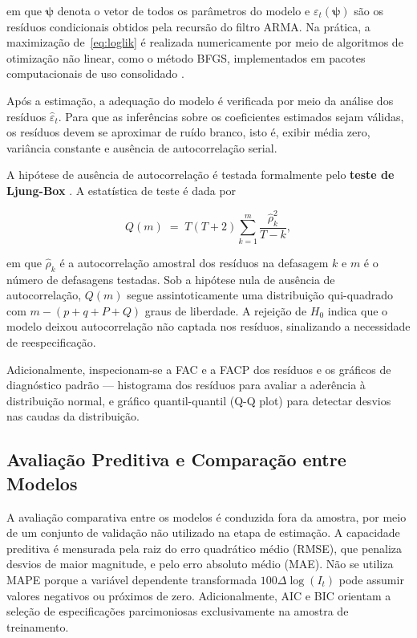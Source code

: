 \noindent
em que \(\boldsymbol{\psi}\) denota o vetor de todos os parâmetros do modelo e
\(\varepsilon_t(\boldsymbol{\psi})\) são os resíduos condicionais obtidos
pela recursão do filtro ARMA. Na prática, a maximização de~\eqref{eq:loglik}
é realizada numericamente por meio de algoritmos de otimização não linear,
como o método BFGS, implementados em pacotes computacionais de uso
consolidado \citep{shumway2017}.
 

Após a estimação, a adequação do modelo é verificada por meio da análise
dos resíduos \(\hat\varepsilon_t\). Para que as inferências sobre os
coeficientes estimados sejam válidas, os resíduos devem se aproximar de
ruído branco, isto é, exibir média zero, variância constante e ausência de
autocorrelação serial.
 
A hipótese de ausência de autocorrelação é testada formalmente pelo
\textbf{teste de Ljung-Box} \citep{ljung1978}. A estatística de teste é
dada por
 
\begin{equation}
  Q(m) \;=\; T(T+2)\sum_{k=1}^{m}\frac{\hat{\rho}_k^2}{T - k},
  \label{eq:ljungbox}
\end{equation}
 
\noindent
em que \(\hat{\rho}_k\) é a autocorrelação amostral dos resíduos na defasagem
\(k\) e \(m\) é o número de defasagens testadas. Sob a hipótese nula de
ausência de autocorrelação, \(Q(m)\) segue assintoticamente uma distribuição
qui-quadrado com \(m - (p + q + P + Q)\) graus de liberdade. A rejeição de
\(H_0\) indica que o modelo deixou autocorrelação não captada nos resíduos,
sinalizando a necessidade de reespecificação.
 
Adicionalmente, inspecionam-se a FAC e a FACP dos resíduos e os gráficos de
diagnóstico padrão — histograma dos resíduos para avaliar a aderência à
distribuição normal, e gráfico quantil-quantil (Q-Q plot) para detectar
desvios nas caudas da distribuição.
 
\subsection{Avaliação Preditiva e Comparação entre Modelos}
\label{sec:sarimax_eval}
 
A avaliação comparativa entre os modelos é conduzida fora da amostra, por
meio de um conjunto de validação não utilizado na etapa de estimação. A
capacidade preditiva é mensurada pela raiz do erro quadrático médio (RMSE),
que penaliza desvios de maior magnitude, e pelo erro absoluto médio (MAE).
Não se utiliza MAPE porque a variável dependente transformada
\(100\Delta\log(I_t)\) pode assumir valores negativos ou próximos de zero.
Adicionalmente, AIC e BIC orientam a seleção de especificações
parcimoniosas exclusivamente na amostra de treinamento.
 
